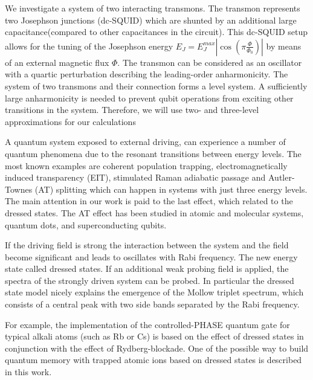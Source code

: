 \documentclass[%
 aip,
 amsmath,amssymb,
 reprint,%
]{revtex4-1}
\begin{document}
We investigate a system of two interacting transmons. The transmon\cite{koch2007charge} represents two Josephson junctions (dc-SQUID) which are shunted by an additional large capacitance(compared to other capacitances in the circuit). This dc-SQUID setup allows for the tuning of the Josephson energy $E_J = E_J^{max}|\cos(\pi \frac{\Phi}{\Phi_0})|$  by
means of an external magnetic flux $\Phi$. The transmon can be considered as an oscillator with a quartic perturbation describing the leading-order anharmonicity. The system of two transmons and their connection forms a level system.
A sufficiently large anharmonicity is needed to prevent qubit operations from exciting other transitions in the system. Therefore, we will use two- and three-level approximations for our calculations


A quantum system exposed to external driving, can experience a number of quantum phenomena due to the resonant transitions between energy levels. The most known examples are coherent population trapping, electromagnetically induced transparency (EIT)\cite{boller1991observation}, stimulated Raman adiabatic passage\cite{bergmann1998coherent} and Autler-Townes (AT) splitting\cite{autler1955stark} which can happen in systems with just three energy levels. 
The main attention in our work is paid to the last effect, which related to the dressed states.
The AT effect has been studied in atomic\cite{picque1976direct} and molecular systems\cite{tamarat1995pump}, quantum dots\cite{xu2007coherent}, and superconducting qubits\cite{li2011decoherence, novikov2013autler}.

If the driving field is strong the interaction between the system and the field become significant and leads to oscillates with Rabi frequency. The new energy state called dressed states. If an additional weak probing field is applied, the spectra of the strongly driven system can be probed. In particular the dressed state model nicely explains the emergence of the Mollow triplet\cite{newstein1968spontaneous} spectrum, which consists of a central peak with two side bands separated by the Rabi frequency.

For example, the implementation of the controlled-PHASE quantum gate for typical alkali atoms (such as Rb or Cs)  is based on the effect of dressed states in conjunction with the effect of Rydberg-blockade\cite{sun2018analysis}. One of the possible way to build quantum memory with trapped atomic ions based on dressed states is described in this work\cite{timoney2011quantum}. 
\end{document}
